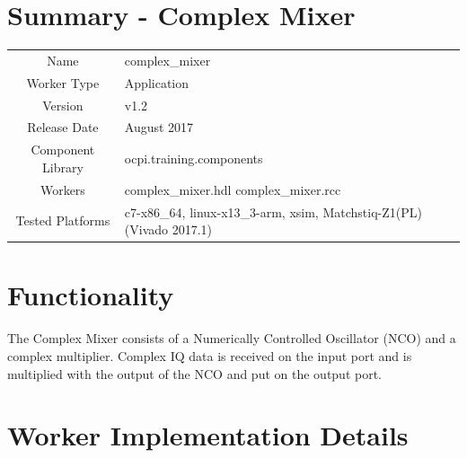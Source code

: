 \documentclass{article}
\author{} %
\date{Version \docVersion} %
\title{\docTitle}
\def\comp{complex\_mixer}
\def\Comp{Complex Mixer}
\begin{document}
\section*{Summary - \Comp}
\begin{tabular}{|c|M{13.5cm}|}
	\hline
	                  &                                                    \\
	\hline
	Name              & \comp                                              \\
	\hline
	Worker Type       & Application                                        \\
	\hline
	Version           & v1.2                                              \\
	\hline
	Release Date      & August 2017                                        \\
	\hline
	Component Library & ocpi.training.components                                  \\
	\hline
	Workers           & \comp.hdl \comp.rcc                               \\
	\hline
	Tested Platforms  & c7-x86\_64, linux-x13\_3-arm, xsim, Matchstiq-Z1(PL)(Vivado 2017.1)\\
	\hline
\end{tabular}

\section*{Functionality}
\begin{flushleft}
	The Complex Mixer consists of a Numerically Controlled Oscillator (NCO) and a complex multiplier. Complex IQ data is received on the input port and is multiplied with the output of the NCO and put on the output port.
\end{flushleft}

\section*{Worker Implementation Details}
\end{document}
